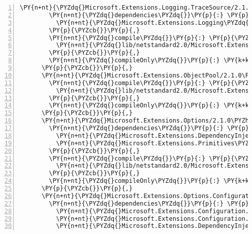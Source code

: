 \begin{Verbatim}[commandchars=\\\{\},numbers=left,firstnumber=1,stepnumber=1,numberblanklines=0]
      \PY{n+nt}{\PYZdq{}Microsoft.Extensions.Logging.TraceSource/2.1.0\PYZhy{}rc1\PYZhy{}final\PYZdq{}}\PY{p}{:} \PY{p}{\PYZob{}}
        \PY{n+nt}{\PYZdq{}dependencies\PYZdq{}}\PY{p}{:} \PY{p}{\PYZob{}}
          \PY{n+nt}{\PYZdq{}Microsoft.Extensions.Logging\PYZdq{}}\PY{p}{:} \PY{l+s+s2}{\PYZdq{}2.1.0\PYZhy{}rc1\PYZhy{}final\PYZdq{}}
        \PY{p}{\PYZcb{}}\PY{p}{,}
        \PY{n+nt}{\PYZdq{}compile\PYZdq{}}\PY{p}{:} \PY{p}{\PYZob{}}
          \PY{n+nt}{\PYZdq{}lib/netstandard2.0/Microsoft.Extensions.Logging.TraceSource.dll\PYZdq{}}\PY{p}{:} \PY{p}{\PYZob{}}\PY{p}{\PYZcb{}}
        \PY{p}{\PYZcb{}}\PY{p}{,}
        \PY{n+nt}{\PYZdq{}compileOnly\PYZdq{}}\PY{p}{:} \PY{k+kc}{true}
      \PY{p}{\PYZcb{}}\PY{p}{,}
      \PY{n+nt}{\PYZdq{}Microsoft.Extensions.ObjectPool/2.1.0\PYZhy{}rc1\PYZhy{}final\PYZdq{}}\PY{p}{:} \PY{p}{\PYZob{}}
        \PY{n+nt}{\PYZdq{}compile\PYZdq{}}\PY{p}{:} \PY{p}{\PYZob{}}
          \PY{n+nt}{\PYZdq{}lib/netstandard2.0/Microsoft.Extensions.ObjectPool.dll\PYZdq{}}\PY{p}{:} \PY{p}{\PYZob{}}\PY{p}{\PYZcb{}}
        \PY{p}{\PYZcb{}}\PY{p}{,}
        \PY{n+nt}{\PYZdq{}compileOnly\PYZdq{}}\PY{p}{:} \PY{k+kc}{true}
      \PY{p}{\PYZcb{}}\PY{p}{,}
      \PY{n+nt}{\PYZdq{}Microsoft.Extensions.Options/2.1.0\PYZhy{}rc1\PYZhy{}final\PYZdq{}}\PY{p}{:} \PY{p}{\PYZob{}}
        \PY{n+nt}{\PYZdq{}dependencies\PYZdq{}}\PY{p}{:} \PY{p}{\PYZob{}}
          \PY{n+nt}{\PYZdq{}Microsoft.Extensions.DependencyInjection.Abstractions\PYZdq{}}\PY{p}{:} \PY{l+s+s2}{\PYZdq{}2.1.0\PYZhy{}rc1\PYZhy{}final\PYZdq{}}\PY{p}{,}
          \PY{n+nt}{\PYZdq{}Microsoft.Extensions.Primitives\PYZdq{}}\PY{p}{:} \PY{l+s+s2}{\PYZdq{}2.1.0\PYZhy{}rc1\PYZhy{}final\PYZdq{}}
        \PY{p}{\PYZcb{}}\PY{p}{,}
        \PY{n+nt}{\PYZdq{}compile\PYZdq{}}\PY{p}{:} \PY{p}{\PYZob{}}
          \PY{n+nt}{\PYZdq{}lib/netstandard2.0/Microsoft.Extensions.Options.dll\PYZdq{}}\PY{p}{:} \PY{p}{\PYZob{}}\PY{p}{\PYZcb{}}
        \PY{p}{\PYZcb{}}\PY{p}{,}
        \PY{n+nt}{\PYZdq{}compileOnly\PYZdq{}}\PY{p}{:} \PY{k+kc}{true}
      \PY{p}{\PYZcb{}}\PY{p}{,}
      \PY{n+nt}{\PYZdq{}Microsoft.Extensions.Options.ConfigurationExtensions/2.1.0\PYZhy{}rc1\PYZhy{}final\PYZdq{}}\PY{p}{:} \PY{p}{\PYZob{}}
        \PY{n+nt}{\PYZdq{}dependencies\PYZdq{}}\PY{p}{:} \PY{p}{\PYZob{}}
          \PY{n+nt}{\PYZdq{}Microsoft.Extensions.Configuration.Abstractions\PYZdq{}}\PY{p}{:} \PY{l+s+s2}{\PYZdq{}2.1.0\PYZhy{}rc1\PYZhy{}final\PYZdq{}}\PY{p}{,}
          \PY{n+nt}{\PYZdq{}Microsoft.Extensions.Configuration.Binder\PYZdq{}}\PY{p}{:} \PY{l+s+s2}{\PYZdq{}2.1.0\PYZhy{}rc1\PYZhy{}final\PYZdq{}}\PY{p}{,}
          \PY{n+nt}{\PYZdq{}Microsoft.Extensions.DependencyInjection.Abstractions\PYZdq{}}\PY{p}{:} \PY{l+s+s2}{\PYZdq{}2.1.0\PYZhy{}rc1\PYZhy{}final\PYZdq{}}\PY{p}{,}

\end{Verbatim}
